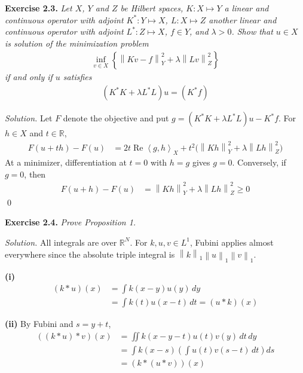 \documentclass[12pt,letterpaper]{article}
\newcommand{\R}{\mathbb R}
\newcommand{\norm}[1]{\left\lVert #1\right\rVert}
\newcommand{\ip}[2]{\left\langle #1,#2\right\rangle}
\newcommand{\exercise}[1]{%
  \par\bigskip\noindent\textbf{Exercise #1.}\enspace}
\newenvironment{statement}{\itshape\ignorespaces}{\par}
\newcommand{\solution}{\par\medskip\noindent\textit{Solution.}\enspace}
\newcommand{\partlabel}[1]{\par\medskip\noindent\textbf{(#1)}\enspace}
\newcommand{\finish}{\qed\par}
\begin{document}
\begin{samepage}
\exercise{2.3}
\begin{statement}
Let $X$, $Y$ and $Z$ be Hilbert spaces, $K:X\mapsto Y$ a linear and
continuous operator with adjoint $K^*:Y\mapsto X$, $L:X\mapsto Z$ another
linear and continuous operator with adjoint $L^*:Z\mapsto X$, $f\in Y$,
and $\lambda>0$. Show that $u\in X$ is solution of the minimization problem
\begin{align*}
 \inf_{v\in X}\left\{\norm{Kv-f}_Y^2+\lambda\norm{Lv}_Z^2\right\}
\end{align*}
if and only if $u$ satisfies
\begin{align*}
 (K^*K+\lambda L^*L)u=(K^*f)
\end{align*}
\end{statement}
\end{samepage}
\solution
Let $F$ denote the objective and put
$g=(K^*K+\lambda L^*L)u-K^*f$. For $h\in X$ and $t\in\R$,
\begin{align*}
 F(u+th)-F(u)
 &=2t\operatorname{Re}\ip{g}{h}_X
   +t^2\bigl(\norm{Kh}_Y^2+\lambda\norm{Lh}_Z^2\bigr)
\end{align*}
At a minimizer, differentiation at $t=0$ with $h=g$ gives $g=0$.
Conversely, if $g=0$, then
\begin{align*}
 F(u+h)-F(u)&=\norm{Kh}_Y^2+\lambda\norm{Lh}_Z^2\geq0
\end{align*}
\finish

\begin{samepage}
\exercise{2.4}
\begin{statement}
Prove Proposition 1.
\end{statement}
\end{samepage}
\solution
All integrals are over $\R^N$. For $k,u,v\in L^1$, Fubini applies
almost everywhere since the absolute triple integral is
$\norm{k}_1\norm{u}_1\norm{v}_1$.

\partlabel{i}
\begin{align*}
 (k*u)(x)&=\int k(x-y)u(y)\,dy\\
 &=\int k(t)u(x-t)\,dt=(u*k)(x)
\end{align*}

\partlabel{ii} By Fubini and $s=y+t$,
\begin{align*}
 ((k*u)*v)(x)
 &=\iint k(x-y-t)u(t)v(y)\,dt\,dy\\
 &=\int k(x-s)\left(\int u(t)v(s-t)\,dt\right)ds\\
 &=(k*(u*v))(x)
\end{align*}
\end{document}
